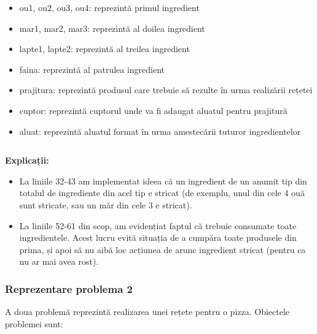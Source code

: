  \begin{itemize}
    \setlength\itemsep{0em}
    \item ou1, ou2, ou3, ou4: reprezintă primul ingredient
    \item mar1, mar2, mar3: reprezintă al doilea ingredient
    \item lapte1, lapte2: reprezintă al treilea ingredient
    \item faina: reprezintă al patrulea ingredient
    \item prajitura: reprezintă produsul care trebuie să rezulte în urma realizării rețetei
    \item cuptor: reprezintă cuptorul unde va fi adaugat aluatul pentru prajitură
    \item aluat: reprezintă aluatul format în urma amestecării tuturor ingredientelor


\end{itemize}


    \inputminted[linenos]{C}{cod/problem_reteta_contingent.pddl}
    
 \textbf{ Explicații:}

  \begin{itemize}
    \setlength\itemsep{0em}
    \item La liniile 32-43 am implementat ideea că un ingredient de un anumit tip din totalul de ingrediente din acel tip e stricat 
  (de exemplu, unul din cele 4 ouă sunt stricate, sau un măr din cele 3 e stricat). 
    \item La liniile 52-61 din scop, am evidențiat faptul că trebuie consumate toate ingredientele. Acest lucru evită situația de a
  cumpăra toate produsele din prima, și apoi să nu aibă loc acțiunea de arunc ingredient stricat (pentru ca nu ar mai avea rost).
 

  
\end{itemize}   


\subsubsection{Reprezentare problema 2}
A doua problemă reprezintă realizarea unei rețete pentru o pizza.
Obiectele problemei sunt:

